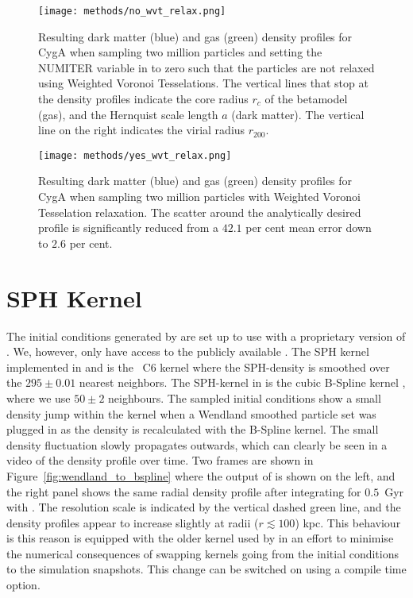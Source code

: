 \documentclass[MScProj_TLRH_ClusterEnergy.tex]{subfiles}
\begin{document}
\begin{figure}
    \centering
    \texttt{[image: methods/no\_wvt\_relax.png]}
    \caption{Resulting dark matter (blue) and gas (green) density profiles for 
             CygA when sampling two million particles and setting the NUMITER
             variable in  to zero such that the particles are
             not relaxed using Weighted Voronoi Tesselations. The vertical lines
             that stop at the density profiles indicate the core radius $r_c$ of
             the betamodel (gas), and the Hernquist scale length $a$ (dark matter).
             The vertical line on the right indicates the virial radius $r_{200}$.}
    \label{fig:no_wvt_relax}
    \texttt{[image: methods/yes\_wvt\_relax.png]}
    \caption{Resulting dark matter (blue) and gas (green) density profiles for
             CygA when sampling two million particles with Weighted Voronoi 
             Tesselation relaxation. The scatter around the analytically desired
             profile is significantly reduced from a $42.1$ per cent mean error 
             down to $2.6$ per cent.}
    \label{fig:yes_wvt_relax}
\end{figure}


\section*{SPH Kernel}
The initial conditions generated by  are set up to use with
a proprietary version of  \citep{2009MNRAS.398.1678D}. We, however,
only have access to the publicly available  \citep{2005MNRAS.364.1105S}.
The SPH kernel implemented in  and  is the 
\citet{wendland1995piecewise, wendland2004scattered}~C6 \citep{2012MNRAS.425.1068D} 
kernel where the SPH-density is smoothed over the $295 \pm 0.01$ nearest neighbors.
The SPH-kernel in  is the cubic B-Spline kernel \citep{1985A&A...149..135M},
where we use $50\pm2$ neighbours. The sampled initial conditions show a small
density jump within the kernel when a Wendland smoothed particle set was plugged 
in  as the density is recalculated with the B-Spline kernel. The
small density fluctuation slowly propagates outwards, which can clearly be seen
in a video of the density profile over time. Two frames are shown in 
Figure~\ref{fig:wendland_to_bspline} where the output of  is
shown on the left, and the right panel shows the same radial density profile 
after integrating for $0.5$~Gyr with . The resolution scale is 
indicated by the vertical dashed green line, and the density profiles appear
to increase slightly at radii ($r \lesssim 100$) kpc. This behaviour is this
reason  is equipped with the older kernel used by  
in an effort to minimise the numerical consequences of swapping kernels going 
from the initial conditions to the simulation snapshots. This change can be
switched on using a compile time option.
\end{document}

